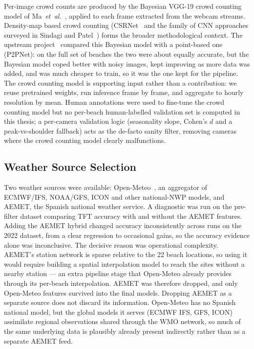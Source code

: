 \documentclass[twocolumn,twoside,a4paper,10pt]{IEEEtran}
\begin{document}
Per-image crowd counts are produced by the Bayesian VGG-19 crowd counting model of Ma~\emph{et~al.}~\cite{Ma2019Bayesian}, applied to each frame extracted from the webcam streams. Density-map based crowd counting (CSRNet~\cite{Li2018CSRNet} and the family of CNN approaches surveyed in Sindagi and Patel~\cite{Sindagi2018Survey}) forms the broader methodological context. The upstream project~\cite{SanchezGarcia2024TFG} compared this Bayesian model with a point-based one (P2PNet): on the full set of beaches the two were about equally accurate, but the Bayesian model coped better with noisy images, kept improving as more data was added, and was much cheaper to train, so it was the one kept for the pipeline. The crowd counting model is supporting input rather than a contribution: we reuse pretrained weights, run inference frame by frame, and aggregate to hourly resolution by mean. Human annotations were used to fine-tune the crowd counting model but no per-beach human-labelled validation set is computed in this thesis; a per-camera validation logic (seasonality slope, Cohen's $d$ and a peak-vs-shoulder fallback) acts as the de-facto sanity filter, removing cameras where the crowd counting model clearly malfunctions.

\subsection{Weather Source Selection}

Two weather sources were available: Open-Meteo~\cite{OpenMeteo2024}, an aggregator of ECMWF/IFS, NOAA/GFS, ICON and other national-NWP models, and AEMET, the Spanish national weather service. A diagnostic was run on the pre-filter dataset comparing TFT accuracy with and without the AEMET features. Adding the AEMET hybrid changed accuracy inconsistently across runs on the 2022 dataset, from a clear regression to occasional gains, so the accuracy evidence alone was inconclusive. The decisive reason was operational complexity. AEMET's station network is sparse relative to the 22 beach locations, so using it would require building a spatial interpolation model to reach the sites without a nearby station --- an extra pipeline stage that Open-Meteo already provides through its per-beach interpolation. AEMET was therefore dropped, and only Open-Meteo features survived into the final models. Dropping AEMET as a separate source does not discard its information. Open-Meteo has no Spanish national model, but the global models it serves (ECMWF IFS, GFS, ICON) assimilate regional observations shared through the WMO network, so much of the same underlying data is plausibly already present indirectly rather than as a separate AEMET feed.
\end{document}
